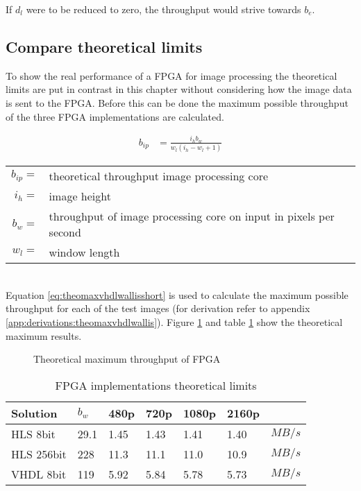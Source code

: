 If $d_l$ were to be reduced to zero, the throughput would strive towards $b_e$.

\subsection{Compare theoretical limits}
To show the real performance of a FPGA for image processing the theoretical
limits are put in contrast in this chapter without considering how the image
data is sent to the FPGA.
Before this can be done the maximum possible throughput of the three FPGA
implementations are calculated.

\begin{align}
    b_{ip}  & = \frac{i_hb_w}{w_l (i_h-w_l+1)}
    \label{eq:theomaxvhdlwallisshort}
\end{align}

\begin{tabular}{rl}
    $b_{ip}=$ & theoretical throughput image processing core \\
    $i_h   =$ & image height \\
    $b_w   =$ & throughput of image processing core on input in pixels per
    second \\
    $w_l   =$ & window length \\
\end{tabular} \\

Equation \ref{eq:theomaxvhdlwallisshort} is used to calculate the maximum
possible throughput for each of the test images (for derivation refer to
appendix \ref{app:derivations:theomaxvhdlwallis}). Figure \ref{fig:theoresults}
and table \ref{tab:FPGAimplementationstheoreticallimits} show the theoretical
maximum results.

\begin{figure}[b!]
    \centering
    \begin{adjustbox}{max width=\linewidth}
        
    \end{adjustbox}
    \caption{Theoretical maximum throughput of FPGA}
    \label{fig:theoresults}
\end{figure}

\begin{table}[b!]
    \centering
    \begin{tabular}{l l l l l l l}
        \toprule
        Solution & $b_w$ & 480p & 720p & 1080p & 2160p & \\
        \midrule
        HLS  8bit       & 29.1 & 1.45 & 1.43 & 1.41 & 1.40 & $MB/s$\\
        HLS  256bit     & 228  & 11.3 & 11.1 & 11.0 & 10.9 & $MB/s$\\
        VHDL 8bit          & 119  & 5.92 & 5.84 & 5.78 & 5.73 & $MB/s$\\
        \bottomrule
    \end{tabular}
    \caption{FPGA implementations theoretical limits}
    \label{tab:FPGAimplementationstheoreticallimits}
\end{table}

